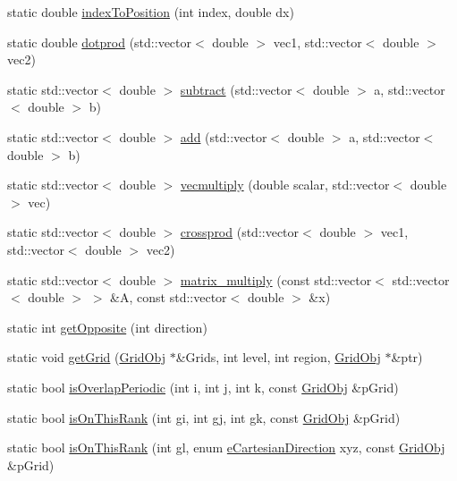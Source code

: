 \begin{DoxyCompactItemize}
\item 
static double \hyperlink{class_grid_utils_a47d5c12d681b275441029744febbb520}{index\+To\+Position} (int index, double dx)
\item 
static double \hyperlink{class_grid_utils_af374256beaf42d97b23f7d98af93a3f1}{dotprod} (std\+::vector$<$ double $>$ vec1, std\+::vector$<$ double $>$ vec2)
\item 
static std\+::vector$<$ double $>$ \hyperlink{class_grid_utils_a6f5af65d6bb25e0d34be50670b41514f}{subtract} (std\+::vector$<$ double $>$ a, std\+::vector$<$ double $>$ b)
\item 
static std\+::vector$<$ double $>$ \hyperlink{class_grid_utils_a4e9fc081a19660e9db39428014c04a9c}{add} (std\+::vector$<$ double $>$ a, std\+::vector$<$ double $>$ b)
\item 
static std\+::vector$<$ double $>$ \hyperlink{class_grid_utils_a01eba1d90d3414637d5031850ad89ce3}{vecmultiply} (double scalar, std\+::vector$<$ double $>$ vec)
\item 
static std\+::vector$<$ double $>$ \hyperlink{class_grid_utils_aeb315c03a681483339de9f60ab2964d6}{crossprod} (std\+::vector$<$ double $>$ vec1, std\+::vector$<$ double $>$ vec2)
\item 
static std\+::vector$<$ double $>$ \hyperlink{class_grid_utils_a0051918813c63802d79bd7d172e8ad8a}{matrix\+\_\+multiply} (const std\+::vector$<$ std\+::vector$<$ double $>$ $>$ \&A, const std\+::vector$<$ double $>$ \&x)
\item 
static int \hyperlink{class_grid_utils_af3c54e468658879756c71b01abd028d5}{get\+Opposite} (int direction)
\item 
static void \hyperlink{class_grid_utils_afac10170d3f6f96a32da6a783b815954}{get\+Grid} (\hyperlink{class_grid_obj}{Grid\+Obj} $\ast$\&Grids, int level, int region, \hyperlink{class_grid_obj}{Grid\+Obj} $\ast$\&ptr)
\item 
static bool \hyperlink{class_grid_utils_a7c13884020ab181ee8cb6dd2ea7e4fd7}{is\+Overlap\+Periodic} (int i, int j, int k, const \hyperlink{class_grid_obj}{Grid\+Obj} \&p\+Grid)
\item 
static bool \hyperlink{class_grid_utils_ac1c2d23d0cdd548368aaaffb4f22502d}{is\+On\+This\+Rank} (int gi, int gj, int gk, const \hyperlink{class_grid_obj}{Grid\+Obj} \&p\+Grid)
\item 
static bool \hyperlink{class_grid_utils_a1d9558846f757c6f60fa61f104b63071}{is\+On\+This\+Rank} (int gl, enum \hyperlink{_grid_utils_8h_afbad8e4a2f1e9903755b1bd2fe8273cf}{e\+Cartesian\+Direction} xyz, const \hyperlink{class_grid_obj}{Grid\+Obj} \&p\+Grid)

\end{DoxyCompactItemize}
